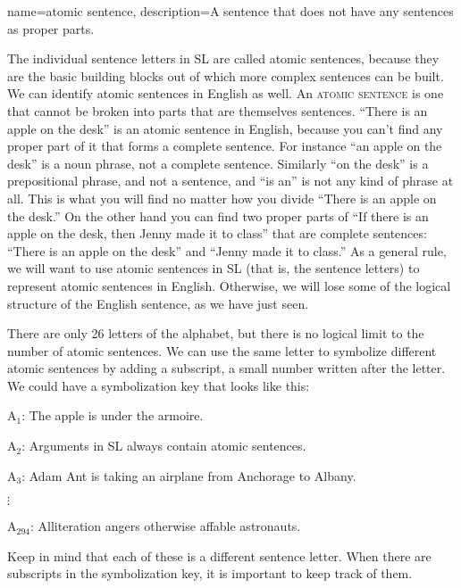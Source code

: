 {
name=atomic sentence,
description={A sentence that does not have any sentences as proper parts.}
}


The individual sentence letters in SL are called atomic sentences, because they are the basic building blocks out of which more complex sentences can be built. We can identify atomic sentences in English as well. An \textsc{\gls{atomic sentence}} \label{def:atomic_sentence} is one that cannot be broken into parts that are themselves sentences. ``There is an apple on the desk'' is an atomic sentence in English, because you can't find any proper part of it that forms a complete sentence. For instance ``an apple on the desk'' is a noun phrase, not a complete sentence. Similarly ``on the desk'' is a prepositional phrase, and not a sentence, and ``is an'' is not any kind of phrase at all. This is what you will find no matter how you divide ``There is an apple on the desk.'' On the other hand you can find two proper parts of ``If there is an apple on the desk, then Jenny made it to class'' that are complete sentences: ``There is an apple on the desk'' and ``Jenny made it to class.'' As a general rule, we will want to use atomic sentences in SL (that is, the sentence letters) to represent atomic sentences in English. Otherwise, we will lose some of the logical structure of the English sentence, as we have just seen. 



There are only 26 letters of the alphabet, but there is no logical limit to the number of atomic sentences. We can use the same letter to symbolize different atomic sentences by adding a subscript, a small number written after the letter. We could have a symbolization key that looks like this:
\begin{ekey}
\item[A$_1$:] The apple is under the armoire.
\item[A$_2$:] Arguments in SL always contain atomic sentences.
\item[A$_3$:] Adam Ant is taking an airplane from Anchorage to Albany.
\item[$\vdots$]
\item[A$_{294}$:] Alliteration angers otherwise affable astronauts.
\end{ekey}
Keep in mind that each of these is a different sentence letter. When there are subscripts in the symbolization key, it is important to keep track of them.


